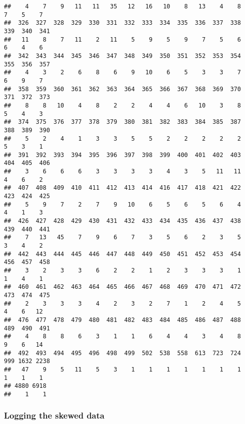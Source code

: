 \documentclass[
]{article}
\newenvironment{Shaded}{\begin{snugshade}}{\end{snugshade}}
\newcommand{\AttributeTok}[1]{\textcolor[rgb]{0.77,0.63,0.00}{#1}}
\newcommand{\FunctionTok}[1]{\textcolor[rgb]{0.00,0.00,0.00}{#1}}
\newcommand{\NormalTok}[1]{#1}
\newcommand{\OtherTok}[1]{\textcolor[rgb]{0.56,0.35,0.01}{#1}}
\newcommand{\SpecialCharTok}[1]{\textcolor[rgb]{0.00,0.00,0.00}{#1}}
\newcommand{\StringTok}[1]{\textcolor[rgb]{0.31,0.60,0.02}{#1}}
\begin{document}
\begin{verbatim}
##    4    7    9   11   11   35   12   16   10    8   13    4    8    7    5    7 
##  326  327  328  329  330  331  332  333  334  335  336  337  338  339  340  341 
##   11    8    7   11    2   11    5    9    5    9    7    5    6    6    4    6 
##  342  343  344  345  346  347  348  349  350  351  352  353  354  355  356  357 
##    4    3    2    6    8    6    9   10    6    5    3    3    7    6    9    7 
##  358  359  360  361  362  363  364  365  366  367  368  369  370  371  372  373 
##    8    8   10    4    8    2    2    4    4    6   10    3    8    5    4    3 
##  374  375  376  377  378  379  380  381  382  383  384  385  387  388  389  390 
##    5    2    4    1    3    3    5    5    2    2    2    2    2    5    3    1 
##  391  392  393  394  395  396  397  398  399  400  401  402  403  404  405  406 
##    3    6    6    6    3    3    3    3    4    3    5   11   11    4    6    2 
##  407  408  409  410  411  412  413  414  416  417  418  421  422  423  424  425 
##    5    9    7    2    7    9   10    6    5    6    5    6    4    4    1    3 
##  426  427  428  429  430  431  432  433  434  435  436  437  438  439  440  441 
##    7   13   45    7    9    6    7    3    5    6    2    3    5    3    4    2 
##  442  443  444  445  446  447  448  449  450  451  452  453  454  456  457  458 
##    3    2    3    3    6    2    2    1    2    3    3    3    1    1    4    1 
##  460  461  462  463  464  465  466  467  468  469  470  471  472  473  474  475 
##    2    3    3    3    4    2    3    2    7    1    2    4    5    4    6   12 
##  476  477  478  479  480  481  482  483  484  485  486  487  488  489  490  491 
##    4    8    8    6    3    1    1    6    4    4    3    4    8    9    6   14 
##  492  493  494  495  496  498  499  502  538  558  613  723  724  999 1632 2238 
##   47    9    5   11    5    3    1    1    1    1    1    1    1    1    1    1 
## 4880 6918 
##    1    1
\end{verbatim}

\hypertarget{logging-the-skewed-data}{%
\subsubsection{Logging the skewed data}\label{logging-the-skewed-data}}

\begin{Shaded}
\end{Shaded}
\end{document}
